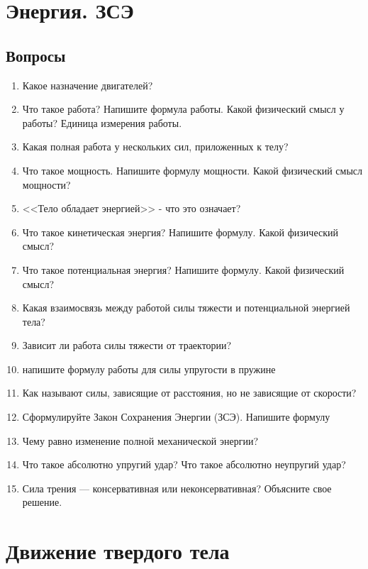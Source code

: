 \documentclass[12pt,a4paper]{report}
\begin{document}
\chapter{Энергия. ЗСЭ}
\section{Вопросы}
\begin{enumerate} 
\item Какое назначение двигателей?
\item Что такое работа? Напишите формула работы. Какой физический смысл у работы? Единица измерения работы.
\item Какая полная работа у нескольких сил, приложенных к телу?
\item Что такое мощность. Напишите формулу мощности. Какой физический смысл мощности?
\item <<Тело обладает энергией>> - что это означает?
\item Что такое кинетическая энергия? Напишите формулу. Какой физический смысл?
\item Что такое потенциальная энергия? Напишите формулу. Какой физический смысл?
\item Какая взаимосвязь между работой силы тяжести и потенциальной энергией тела?
\item Зависит ли работа силы тяжести от траектории?
\item напишите формулу работы для силы упругости в пружине
\item Как называют силы, зависящие от расстояния, но не зависящие от скорости?
\item Сформулируйте Закон Сохранения Энергии (ЗСЭ). Напишите формулу
\item Чему равно изменение полной механической энергии?
\item Что такое абсолютно упругий удар? Что такое абсолютно неупругий удар?
\item Сила трения --- консервативная или неконсервативная? Объясните свое решение.
\end{enumerate}

\chapter{Движение твердого тела}
\end{document}
